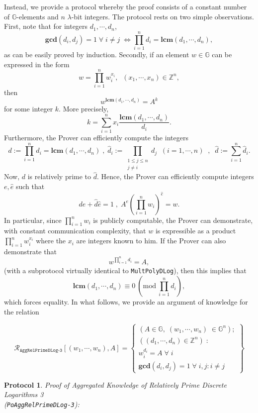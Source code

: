 \documentclass[11pt, lettersize, notitlepage, leqno, footskip=0.6cm]{article}
\newcommand{\bz}{\mathbb Z}
\newcommand{\pl}{\prod\limits}
\newcommand{\slim}{\sum\limits}
\newcommand{\ttt}{\texttt}
\newcommand{\LRA}{\Longleftrightarrow}
\newcommand{\mc}{\mathcal}
\newcommand{\mb}{\mathbb}
\newcommand{\mbf}{\mathbf}
\newcommand{\lam}{\lambda}
\newcommand{\what}{\widehat}
\newcommand{\vs}{\vspace{-0.15cm}}
\newcommand{\Mod}[1]{\ (\mathrm{mod}\ #1)}
\newcommand{\LCM}{\mbf{lcm}}
\newcommand{\GCD}{\mbf{gcd}}
\newtheorem{Prot}[Thm]{Protocol}
\numberwithin{equation}{section}
\begin{document}
Instead, we provide a protocol whereby the proof consists of a constant number of $\mb{G}$-elements and $n$ $\lam$-bit integers. The protocol rests on two simple observations. First, note that for integers $d_1,\cdots,d_n$, \vs $$\GCD(d_i,d_j)=1\;\forall\;i\neq j\; \LRA \pl_{i=1}^n d_i= \LCM(d_1,\cdots,d_n),$$ as can be easily proved by induction. Secondly, if an element $w\in \mb{G}$ can be expressed in the form \vspace{-0.15cm}$$w = \prod\limits_{i=1}^n w_i^{x_i},\;\;(x_1,\cdots,x_n)\in\bz^n,$$ then \vs $$w^{\LCM(d_1,\cdots,d_n)} = A^{k} $$ for some integer $k$. More precisely, \vs $$k = \slim_{i=1}^n x_i\frac{\LCM(d_1,\cdots,d_n)}{d_i}.$$ Furthermore, the Prover can efficiently compute the integers \vs $$d:= \pl_{i=1}^n d_i = \LCM(d_1,\cdots,d_n)\;,\;\what{d}_i:= \pl_{\substack{1\leq j\leq n\\ j\neq i}} d_j\;\; (i=1,\cdots,n)\;\;,\;\; \what{d} := \slim_{i=1}^n \what{d}_i.$$ Now, $d$ is relatively prime to $\what{d}$. Hence, the Prover can efficiently compute integers $e,\what{e}$ such that $$de+\what{d}\what{e} = 1\;,\; A^e(\pl_{i=1}^n w_i)^{\what{e}} = w.  $$ In particular, since $\pl_{i=1}^n w_i$ is publicly computable, the Prover can demonstrate, with constant communication complexity, that $w$ is expressible as a product $\pl_{i=1}^n w_i^{x_i}$ where the $x_i$ are integers known to him. If the Prover can also demonstrate that $$w^{\prod\limits_{i=1}^n d_i} = A,$$ (with a subprotocol virtually identical to \verb|MultPolyDLog|), then this implies that \vspace{-0.15cm}$$\LCM(d_1,\cdots,d_n)\equiv 0\Mod{ \prod\limits_{i=1}^n d_i},$$ which forces equality. In what follows, we provide an argument of knowledge for the relation 

\[
  \mc{R}_{\ttt{AggRelPrimeDLog-3}}[(w_1,\cdots, w_n), A] = \left\{\begin{array}{l}
    (A\in\mb{G},\; (w_1,\cdots, w_n)\;\in\mb{G}^n);\\
    ((d_1,\cdots,d_n)\in\bz^n)\;: \\
    w_i^{d_i} = A\;\forall\;i\\
   	\GCD(d_i, d_j) = 1\;\forall \;i,j: i\neq j
  \end{array}\right\}
\] 

\vspace{0.2cm}



\begin{Prot} \normalfont \textit{Proof of Aggregated Knowledge of Relatively Prime Discrete Logarithms} 3\\ (\verb|PoAggRelPrimeDLog-3|):\end{Prot} \vspace{-0.3cm}
\end{document}
